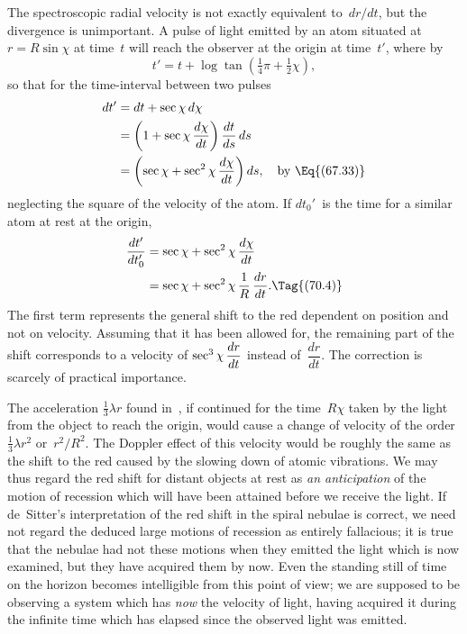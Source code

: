 \documentclass[12pt]{book}
\begin{document}
The spectroscopic radial velocity is not exactly equivalent to~$dr/dt$, but
%
the divergence is unimportant. A pulse of light emitted by an atom situated
at $r = R\sin\chi$ at time~$t$ will reach the observer at the origin at time~$t'$, where
by~
\[
t' = t + \log\tan(\tfrac{1}{4}\pi + \tfrac{1}{2}\chi),
\]
so that for the time-interval between two pulses
\begin{align*}
dt' &= dt + \sec\chi\, d\chi \\
&= \left(1 + \sec\chi\, \frac{d\chi}{dt}\right) \frac{dt}{ds}\, ds \\
&= \left(\sec\chi + \sec^{2}\chi\, \frac{d\chi}{dt}\right) ds,
\quad\text{by~\Eq{(67.33)}}
\end{align*}
%
neglecting the square of the velocity of the atom. If $dt_{0}'$~is the time for a
similar atom at rest at the origin,
\begin{align*}
  \frac{dt'}{dt_{0}'}
  &= \sec\chi + \sec^{2}\chi\, \frac{d\chi}{dt} \\
  &= \sec\chi + \sec^{2}\chi\, \frac{1}{R}\, \frac{dr}{dt}.
  \Tag{(70.4)}
\end{align*}
The first term represents the general shift to the red dependent on position
and not on velocity. Assuming that it has been allowed for, the remaining
part of the shift corresponds to a velocity of $\smash[b]{\sec^{3}\chi\, \dfrac{dr}{dt}}$ instead of~$\dfrac{dr}{dt}$. The
correction is scarcely of practical importance.

The acceleration $\frac{1}{3}\lambda r$ found in~, if continued for the time~$R\chi$ taken
by the light from the object to reach the origin, would cause a change of
velocity of the order $\frac{1}{3}\lambda r^{2}$ or~$r^{2}/R^{2}$. The Doppler effect of this velocity would
be roughly the same as the shift to the red caused by the slowing down of
atomic vibrations. We may thus regard the red shift for distant objects at
rest as \emph{an anticipation} of the motion of recession which will have been attained
before we receive the light. If de~Sitter's interpretation of the red shift in
the spiral nebulae is correct, we need not regard the deduced large motions
of recession as entirely fallacious; it is true that the nebulae had not these
motions when they emitted the light which is now examined, but they have
acquired them by now. Even the standing still of time on the horizon becomes
intelligible from this point of view; we are supposed to be observing a system
which has \emph{now} the velocity of light, having acquired it during the infinite
time which has elapsed since the observed light was emitted.
\end{document}
